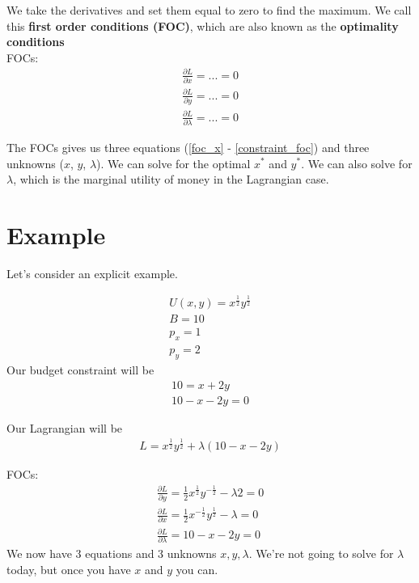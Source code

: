 \documentclass{article}
\begin{document}
We take the derivatives and set them equal to zero to find the maximum. We call this \textbf{first order conditions (FOC)}, which are also known as the \textbf{optimality conditions}\\

FOCs:
\begin{align}
    \frac{\partial L}{\partial x} =... = 0 \label{foc_x}\\
    \frac{\partial L}{\partial y} =... = 0 \label{foc_y}\\
    \frac{\partial L}{\partial \lambda} =... = 0 \label{constraint_foc}
\end{align}

The FOCs gives us three equations (\ref{foc_x} - \ref{constraint_foc}) and three unknowns ($x$, $y$, $\lambda$). We can solve for the optimal $x^*$ and $y^*$. We can also solve for $\lambda$, which is the marginal utility of money in the Lagrangian case.

\section{Example}
Let's consider an explicit example. 

\begin{align*}
    U(x, y) = x^\frac{1}{2} y^\frac{1}{2}\\
    B = 10\\
    p_x = 1\\
    p_y = 2
\end{align*}
Our budget constraint will be 
\begin{align*}
    10 = x + 2 y\\
    10 - x - 2y = 0 
\end{align*}

Our Lagrangian will be 
\begin{align*}
    L = x^\frac{1}{2} y^\frac{1}{2} + \lambda( 10 - x - 2y)
\end{align*}

FOCs:
\begin{align}
    \frac{\partial L}{\partial y} = \frac{1}{2} x^\frac{1}{2} y^{-\frac{1}{2}}-\lambda 2 = 0 \label{dy}\\
    \frac{\partial L}{\partial x} = \frac{1}{2} x^{-\frac{1}{2}} y^{\frac{1}{2}}-\lambda  = 0 \label{dx}\\
    \frac{\partial L}{\partial \lambda} = 10 - x - 2y = 0 \label{const}
\end{align}
We now have 3 equations and 3 unknowns $x, y, \lambda$. We're not going to solve for $\lambda$ today, but once you have $x$ and $y$ you can.\\
\end{document}
